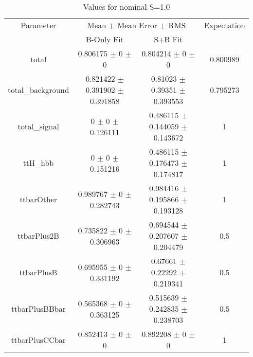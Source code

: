 \begin{table}
\centering
\caption{Values for nominal S=1.0}
\begin{tabular}{cccc}
\toprule
Parameter & \multicolumn{2}{c}{Mean $\pm$ Mean Error $\pm$ RMS} & Expectation\\
 & B-Only Fit & S+B Fit & \\
\midrule
total & \num{0.806175} $\pm$ \num{0} $\pm$ \num{0} & \num{0.804214} $\pm$ \num{0} $\pm$ \num{0} & \num{0.800989}\\
total\_background & \num{0.821422} $\pm$ \num{0.391902} $\pm$ \num{0.391858} & \num{0.81023} $\pm$ \num{0.39351} $\pm$ \num{0.393553} & \num{0.795273}\\
total\_signal & \num{0} $\pm$ \num{0} $\pm$ \num{0.126111} & \num{0.486115} $\pm$ \num{0.144059} $\pm$ \num{0.143672} & \num{1}\\
ttH\_hbb & \num{0} $\pm$ \num{0} $\pm$ \num{0.151216} & \num{0.486115} $\pm$ \num{0.176473} $\pm$ \num{0.174817} & \num{1}\\
ttbarOther & \num{0.989767} $\pm$ \num{0} $\pm$ \num{0.282743} & \num{0.984416} $\pm$ \num{0.195866} $\pm$ \num{0.193128} & \num{1}\\
ttbarPlus2B & \num{0.735822} $\pm$ \num{0} $\pm$ \num{0.306963} & \num{0.694544} $\pm$ \num{0.207607} $\pm$ \num{0.204479} & \num{0.5}\\
ttbarPlusB & \num{0.695955} $\pm$ \num{0} $\pm$ \num{0.331192} & \num{0.67661} $\pm$ \num{0.22292} $\pm$ \num{0.219341} & \num{0.5}\\
ttbarPlusBBbar & \num{0.565368} $\pm$ \num{0} $\pm$ \num{0.363125} & \num{0.515639} $\pm$ \num{0.242835} $\pm$ \num{0.238703} & \num{0.5}\\
ttbarPlusCCbar & \num{0.852413} $\pm$ \num{0} $\pm$ \num{0} & \num{0.892208} $\pm$ \num{0} $\pm$ \num{0} & \num{1}\\
\bottomrule
\end{tabular}
\end{table}